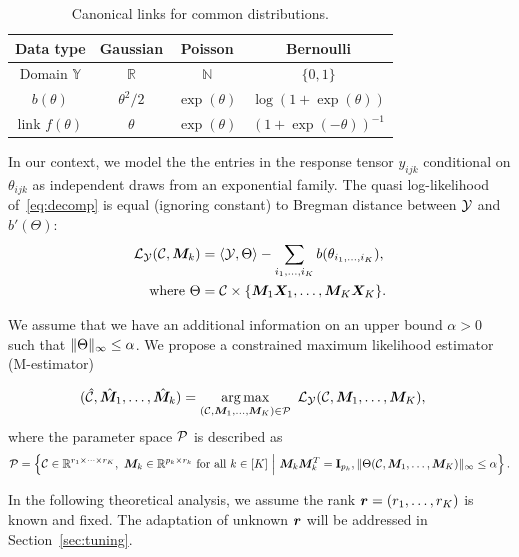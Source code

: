 \documentclass[12pt]{article}
\theoremstyle{plain}
\theoremstyle{definition}
\begin{document}
\begin{table}[htb]
\centering
\begin{tabular}{c|ccc}
Data type &Gaussian & Poisson& Bernoulli\\
\hline
Domain $\mathbb{Y}$& $\mathbb{R}$&$\mathbb{N}$&$\{0,1\}$\\
 $b(\theta)$&$\theta^2/2$& $\exp(\theta)$&$\log (1+\exp(\theta))$\\
 link $f(\theta)$&$\theta$&$\exp(\theta)$&$(1+\exp(-\theta))^{-1}$
\end{tabular}
\caption{Canonical links for common distributions.}\label{table:link}
\end{table}


In our context, we model the the entries in the response tensor $y_{ijk}$ conditional on $\theta_{ijk}$ as independent draws from an exponential family. The quasi log-likelihood of~\eqref{eq:decomp} is equal (ignoring constant) to Bregman distance between $\mathcal{Y}$ and $b'(\Theta)$:
\begin{align}
\mathcal{L}_{\mathcal{Y}}(\mathcal{C},\bm M_k)&=\langle \mathcal{Y}, \Theta \rangle - \sum_{i_1,\ldots,i_K} b(\theta_{i_1,\ldots,i_K}),\\
\text{where}\ \Theta&=\mathcal{C}\times\{\bm M_1\bm X_1,\ldots,\bm M_K\bm X_K\}.
\end{align}

{\color{red}We assume that we have an additional information on an upper bound $\alpha>0$ such that $\lVert\Theta\rVert_\infty\leq \alpha$.} We propose a constrained maximum likelihood estimator (M-estimator)

\begin{align} \label{eq:MLE} 
(\hat \tC, \hat \mM_1,\ldots,\hat \mM_k) &=\argmax_{(\tC,\mM_1,\ldots,\mM_K)\in \tP} \ \tL_{\tY}(\tC,\mM_1,\ldots,\mM_K),
\end{align}
where the parameter space $\mathcal{P}$ is described as
\[
\mathcal{P}=\left\{\mathcal{C}\in\mathbb{R}^{r_1\times \cdots\times r_K},\ \bm M_k\in\mathbb{R}^{p_k\times r_k}\text{ for all }k\in[K]\ \Big| \ \bm M_k\bm M^T_k=\mathbf{I}_{p_k}, \lVert\Theta(\mathcal{C},\bm M_1,\ldots,\bm M_K)\rVert_\infty\leq \alpha \right\}.
\]


In the following theoretical analysis, we assume the rank $\bm{r}=(r_1,\ldots,r_K)$ is known and fixed. The adaptation of unknown $\bm{r}$ will be addressed in Section~\ref{sec:tuning}. 
\end{document}

